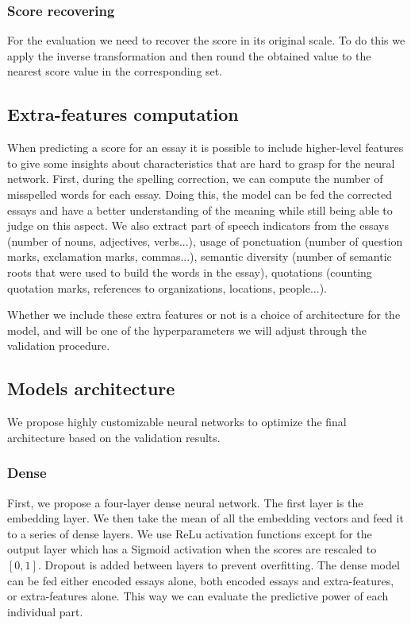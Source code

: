 \documentclass[a4paper,12pt,english]{article}
\begin{document}
\subsubsection{Score recovering}
For the evaluation we need to recover the score in its original scale.
To do this we apply the inverse transformation and then round the obtained value to the nearest score value in the corresponding set.

\subsection{Extra-features computation}
\label{pos:extrafeats}
When predicting a score for an essay it is possible to include higher-level features to give some insights about characteristics that are hard to grasp for the neural network.
First, during the spelling correction, we can compute the number of misspelled words for each essay. Doing this, the model can be fed the corrected essays and have a better understanding of the meaning while still being able to judge on this aspect.
We also extract part of speech indicators from the essays (number of nouns, adjectives, verbs...), usage of ponctuation (number of question marks, exclamation marks, commas...), semantic diversity (number of semantic roots that were used to build the words in the essay), quotations (counting quotation marks, references to organizations, locations, people...).\par
Whether we include these extra features or not is a choice of architecture for the model, and will be one of the hyperparameters we will adjust through the validation procedure.

\subsection{Models architecture}
We propose highly customizable neural networks to optimize the final architecture based on the validation results.
\subsubsection{Dense}
\label{pos:densearchi}
First, we propose a four-layer dense neural network.
The first layer is the embedding layer.
We then take the mean of all the embedding vectors and feed it to a series of dense layers.
We use ReLu activation functions except for the output layer which has a Sigmoid activation when the scores are rescaled to $[0,1]$.
Dropout is added between layers to prevent overfitting.
The dense model can be fed either encoded essays alone, both encoded essays and extra-features, or extra-features alone.
This way we can evaluate the predictive power of each individual part.
\end{document}

